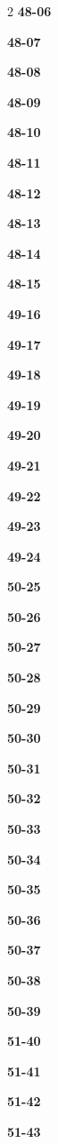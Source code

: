 \documentclass[10pt,a4paper]{article}
\begin{document}
\begin{multicols}{2}
\noindent\textbf{48-06}\ \par
\noindent\textbf{48-07}\ \par
\noindent\textbf{48-08}\ \par
\noindent\textbf{48-09}\ \par
\noindent\textbf{48-10}\ \par
\noindent\textbf{48-11}\ \par
\noindent\textbf{48-12}\ \par
\noindent\textbf{48-13}\ \par
\noindent\textbf{48-14}\ \par
\noindent\textbf{48-15}\ \par
\noindent\textbf{49-16}\ \par
\noindent\textbf{49-17}\ \par
\noindent\textbf{49-18}\ \par
\noindent\textbf{49-19}\ \par
\noindent\textbf{49-20}\ \par
\noindent\textbf{49-21}\ \par
\noindent\textbf{49-22}\ \par
\noindent\textbf{49-23}\ \par
\noindent\textbf{49-24}\ \par
\noindent\textbf{50-25}\ \par
\noindent\textbf{50-26}\ \par
\noindent\textbf{50-27}\ \par
\noindent\textbf{50-28}\ \par
\noindent\textbf{50-29}\ \par
\noindent\textbf{50-30}\ \par
\noindent\textbf{50-31}\ \par
\noindent\textbf{50-32}\ \par
\noindent\textbf{50-33}\ \par
\noindent\textbf{50-34}\ \par
\noindent\textbf{50-35}\ \par
\noindent\textbf{50-36}\ \par
\noindent\textbf{50-37}\ \par
\noindent\textbf{50-38}\ \par
\noindent\textbf{50-39}\ \par
\noindent\textbf{51-40}\ \par
\noindent\textbf{51-41}\ \par
\noindent\textbf{51-42}\ \par
\noindent\textbf{51-43}\ \par

\end{multicols}
\end{document}
